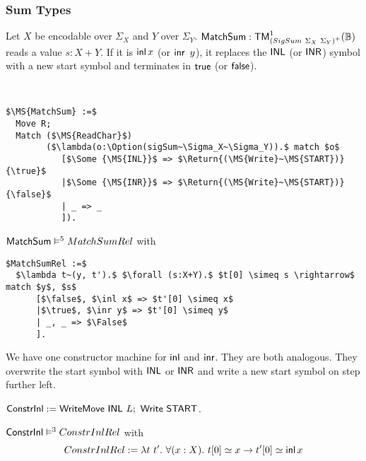 \subsubsection{Sum Types}
\label{sec:match-sum}

Let $X$ be encodable over $\Sigma_X$ and $Y$ over $\Sigma_Y$.  $\mathsf{MatchSum} : \mathsf{TM}_{\left(SigSum~\Sigma_X~\Sigma_Y\right)^+}^1(\mathbb{B})$ reads a value
$s:X+Y$.  If it is $\operatorname{\mathsf{inl}} x$ (or $\operatorname{\mathsf{inr}}~y$), it replaces the $\mathsf{INL}$ (or $\mathsf{INR}$) symbol with a new start symbol and terminates in $\mathsf{true}$ (or
$\mathsf{false}$).

\begin{definition}[$\MS{MatchSum}$]
  \label{def:MatchSum}
  ~
  \small
\begin{lstlisting}[style=semicoqstyle]
$\MS{MatchSum} :=$
  Move R; 
  Match ($\MS{ReadChar}$) 
        ($\lambda(o:\Option(sigSum~\Sigma_X~\Sigma_Y)).$ match $o$
           [$\Some {\MS{INL}}$ => $\Return{(\MS{Write}~\MS{START})}{\true}$
           |$\Some {\MS{INR}}$ => $\Return{(\MS{Write}~\MS{START})}{\false}$
           | _ => _ 
           ]).
\end{lstlisting}
\end{definition}

\begin{lemma}
  \label{lem:MatchSum_Realise}
  $\mathsf{MatchSum} \mathrel{\vDash^{5}} MatchSumRel$ with
\begin{lstlisting}[style=semicoqstyle]
$MatchSumRel :=$
  $\lambda t~(y, t').$ $\forall (s:X+Y).$ $t[0] \simeq s \rightarrow$ match $y$, $s$
      [$\false$, $\inl x$ => $t'[0] \simeq x$
      |$\true$, $\inr y$ => $t'[0] \simeq y$
      | _, _ => $\False$
      ].
\end{lstlisting}
\end{lemma}

We have one constructor machine for $\operatorname{\mathsf{inl}}$ and $\operatorname{\mathsf{inr}}$.  They are both analogous.  They overwrite the start symbol with $\mathsf{INL}$ or $\mathsf{INR}$ and
write a new start symbol on step further left.
\begin{definition}[$\MS{ConstrInl}$]
  \label{def:Constr_inl}
  $\mathsf{ConstrInl} := \mathsf{WriteMove}~\mathsf{INL}~L ;~ \mathsf{Write}~\mathsf{START}$.
\end{definition}
\begin{lemma}
  \label{lem:Constr_inl_Sem}
  $\mathsf{ConstrInl} \mathrel{\vDash^{3}} ConstrInlRel$ with
  \[
    ConstrInlRel := \lambda t~t'.~\forall(x:X).~t[0] \simeq x \rightarrow t'[0] \simeq \operatorname{\mathsf{inl}} x
  \]
\end{lemma}

